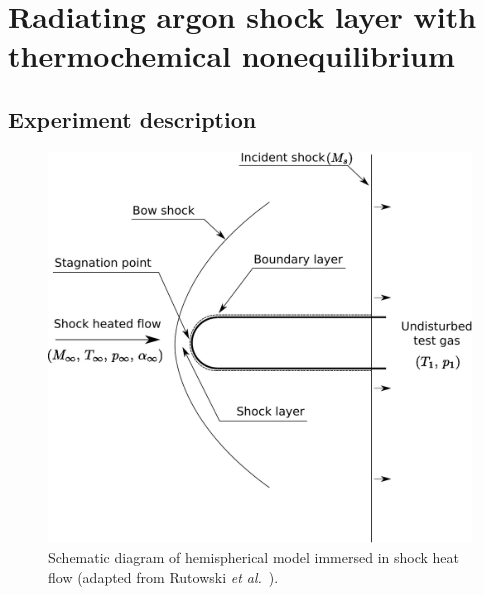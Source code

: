 
\section{Radiating argon shock layer with thermochemical nonequilibrium}
\label{sec:rutowski}
%

\subsection{Experiment description}

\begin{figure}[b!]
 \centering
 \includegraphics[scale=0.5]{../2D/Rutowski-hemisphere/figures/schematic.pdf}
 \caption{Schematic diagram of hemispherical model immersed in shock heat flow (adapted from Rutowski \textit{et al.}~\cite{RB64}).}
  \label{fig:rutowskiSchematic}
\end{figure}

